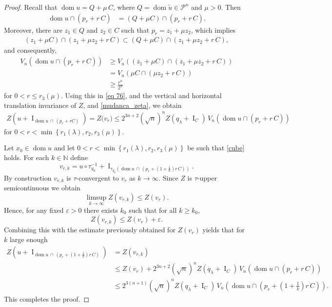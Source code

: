 \documentclass[11pt]{article}
\theoremstyle{definition} %
\DeclareMathOperator{\I}{I}
\DeclareMathOperator{\dom}{dom}
\begin{document}
\begin{proof}
Recall that $\dom u= Q+\mu\, C$, where $Q=\dom \tilde{u}\in\mathcal{P}^n$ and $\mu>0$. Then 
\begin{align*}
   \dom u\cap (p_r+r\, C) &= (Q+\mu C)\cap (p_r+r\, C).
\end{align*}
Moreover, there are $z_1\in Q$ and $z_2\in C$ such that $p_r=z_1+\mu z_2$, which implies
\begin{align*}
    (z_1+\mu C)\cap (z_1+\mu z_2+r\, C)\subset (Q+\mu C)\cap (z_1+\mu z_2+r\, C), 
\end{align*}
and consequently,
\begin{align}
\nonumber   V_n(\dom u\cap (p_r+r\, C))& \geq V_n((z_1+\mu C)\cap (z_1+\mu z_2+r\, C))\\
\nonumber & = V_n(\mu C\cap (\mu z_2+r\, C))\\
\label{eq 77}    &\geq \frac{r^n}{2^n} 
\end{align}
for $0<r\leq r_3(\mu)$. Using this in \eqref{eq 76}, and the vertical and horizontal translation invariance of $Z$, and \eqref{mudanca_zeta}, we obtain
\begin{align}\label{cube}
Z(u+\I_{ \dom u\,\cap \,(p_r+rC)}) =Z\bigl(v_r\bigr) \leq  2^{3n+2}(\sqrt{n})^nZ(q_\lambda+\I_C)\, V_n(\dom u\cap (p_r+r\, C))
\end{align}
for $0<r< \min\left\{r_1(\lambda), r_2, r_3(\mu)\right\}$.

Let $x_0\in  \dom u$ and let $0<r< \min\left\{r_1(\lambda),r_2, r_3(\mu)\right\}$ be such that \eqref{cube} holds. For each $k\in\mathbb{N}$ define
$$v_{r,k}=  u\circ \tau_{y_0}^{-1}+\I_{\tau_{y_0}(\dom u\, \cap \, (p_r+(1+\frac{1}{k})r\, C))}.$$
By construction $v_{r,k}$ is $\tau$-convergent to $v_r$ as $k\to \infty$. Since $Z$ is $\tau$-upper semicontinuous we obtain 
$$
\limsup_{k\to\infty} Z(v_{r,k}) \le Z(v_r).
$$
Hence, for any fixed $\varepsilon>0$ there exists $k_0$ such that for all $k\ge k_0$,
$$
Z(v_{r,k}) \le Z(v_r) + \varepsilon.
$$
Combining this with the estimate previously obtained for $Z(v_r)$ yields that for $k$ large enough
\begin{align*}
\nonumber Z(u+\I_{\dom u\, \cap \, (p_r+(1+\frac{1}{k})r\, C)})&=Z(v_{r,k})\\
\nonumber &\le Z(v_r)+  2^{3n+2}(\sqrt{n})^nZ(q_\lambda+\I_C)\, V_n(\dom u\cap (p_r+r\, C))\\
&\le  2^{3(n+1)}(\sqrt{n})^nZ(q_\lambda+\I_C)\, V_n(\dom u\cap (p_r+(1+\tfrac{1}{k})r\, C)).
\end{align*}
This completes the proof.
\end{proof}
\end{document}
